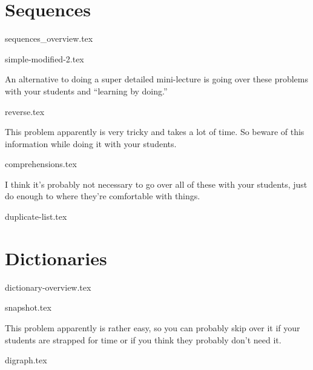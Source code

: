 \documentclass{exam}
\begin{document}
\section{Sequences}
{sequences_overview.tex}
\begin{questions}
    {simple-modified-2.tex}
    \begin{questionmeta}
        An alternative to doing a super detailed mini-lecture is going over these problems with your students and ``learning by doing.'' 
    \end{questionmeta}
    {reverse.tex}
    \begin{questionmeta}
        This problem apparently is very tricky and takes a lot of time. So beware of this information while doing it with your students. 
    \end{questionmeta}
    \newpage %
    {comprehensions.tex}
    \begin{questionmeta}
        I think it's probably not necessary to go over all of these with your students, just do enough to where they're comfortable with things. 
    \end{questionmeta}
    {duplicate-list.tex}
\end{questions}

\section{Dictionaries}
{dictionary-overview.tex}
\begin{questions}
    {snapshot.tex}
    \begin{questionmeta}
        This problem apparently is rather easy, so you can probably skip over it if your students are strapped for time or if you think they probably don't need it. 
    \end{questionmeta}
    {digraph.tex}
\end{questions}
\end{document}
